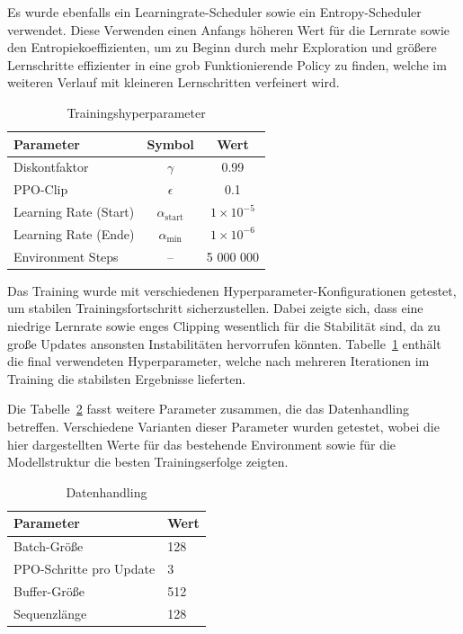 Es wurde ebenfalls ein Learningrate-Scheduler sowie ein Entropy-Scheduler verwendet. Diese Verwenden einen Anfangs höheren Wert für die Lernrate sowie den Entropiekoeffizienten, um zu Beginn durch mehr Exploration und größere Lernschritte effizienter in eine grob Funktionierende Policy zu finden, welche im weiteren Verlauf mit kleineren Lernschritten verfeinert wird.

\begin{table}[htbp] 
    \centering
    \caption{Trainingshyperparameter}
    \label{tab:parameterwerte}
    \begin{tabular}{@{}lcc@{}}
        \toprule
        Parameter & Symbol & Wert\\
        \midrule
        Diskontfaktor & \(\gamma\) & 0.99 \\
        PPO-Clip & \(\epsilon\) & 0.1 \\
        Learning Rate (Start)               & \(\alpha_{\mathrm{start}}\)  & \(1\times10^{-5}\)  \\
        Learning Rate (Ende)                & \(\alpha_{\mathrm{min}}\)    & \(1\times10^{-6}\)  \\
        Environment Steps                   & –                       & 5 000 000  \\
        \bottomrule
    \end{tabular}
\end{table}
Das Training wurde mit verschiedenen Hyperparameter-Konfigurationen getestet, um stabilen Trainingsfortschritt sicherzustellen. Dabei zeigte sich, dass eine niedrige Lernrate sowie enges Clipping wesentlich für die Stabilität sind, da zu große Updates ansonsten Instabilitäten hervorrufen könnten. Tabelle~\ref{tab:parameterwerte} enthält die final verwendeten Hyperparameter, welche nach mehreren Iterationen im Training die stabilsten Ergebnisse lieferten.

Die Tabelle~\ref{tab:data_handling} fasst weitere Parameter zusammen, die das Datenhandling betreffen. Verschiedene Varianten dieser Parameter wurden getestet, wobei die hier dargestellten Werte für das bestehende Environment sowie für die Modellstruktur die besten Trainingserfolge zeigten.

\begin{table}[htbp]
  \centering
  \caption{Datenhandling}
  \label{tab:data_handling}
  \begin{tabular}{ll}
    \toprule
    Parameter             & Wert     \\
    \midrule
    Batch-Größe           & 128       \\
    PPO-Schritte pro Update & 3         \\
    Buffer-Größe          & 512      \\
    Sequenzlänge          & 128      \\
    \bottomrule
  \end{tabular}
\end{table}